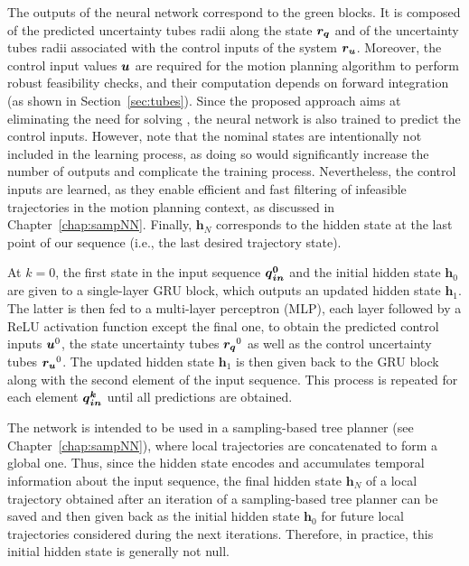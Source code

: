 The outputs of the neural network correspond to the green blocks.
It is composed of the predicted uncertainty tubes radii along the state $\boldsymbol{r_q}$ and of the uncertainty tubes radii associated with the control inputs of the system $\boldsymbol{r_u}$.
Moreover, the control input values $\boldsymbol{u}$ are required for the motion planning algorithm to perform robust feasibility checks, and their computation depends on  forward integration (as shown in Section~\ref{sec:tubes}). 
Since the proposed approach aims at eliminating the need for solving , the neural network is also trained to predict the control inputs.
However, note that the nominal states are intentionally not included in the learning process, as doing so would significantly increase the number of outputs and complicate the training process. 
Nevertheless, the control inputs are learned, as they enable efficient and fast filtering of infeasible trajectories in the motion planning context, as discussed in Chapter~\ref{chap:sampNN}.
Finally, $\boldsymbol{h}_{N}$ corresponds to the hidden state at the last point of our sequence (i.e., the last desired trajectory state).

At $k=0$, the first state in the input sequence $\boldsymbol{\boldsymbol{q}_{in}^0}$ and the initial hidden state $\boldsymbol{h}_0$ are given to a single-layer GRU block, which outputs an updated hidden state $\boldsymbol{h}_1$. 
The latter is then fed to a multi-layer perceptron (MLP), each layer followed by a ReLU activation function except the final one, to obtain the predicted control inputs $\boldsymbol{u}^0$, the state uncertainty tubes $\boldsymbol{r_q}^0$ as well as the control uncertainty tubes $\boldsymbol{r_u}^0$. 
The updated hidden state $\boldsymbol{h}_1$ is then given back to the GRU block along with the second element of the input sequence. 
This process is repeated for each element $\boldsymbol{\boldsymbol{q}_{in}^k}$ until all predictions are obtained.

The network is intended to be used in a sampling-based tree planner (see Chapter~\ref{chap:sampNN}), where local trajectories are concatenated to form a global one. 
Thus, since the hidden state encodes and accumulates temporal information about the input sequence, the final hidden state $\boldsymbol{h}_{N}$ of a local trajectory obtained after an iteration of a sampling-based tree planner can be saved and then given back as the initial hidden state $\boldsymbol{h}_{0}$ for future local trajectories considered during the next iterations. 
Therefore, in practice, this initial hidden state is generally not null.

